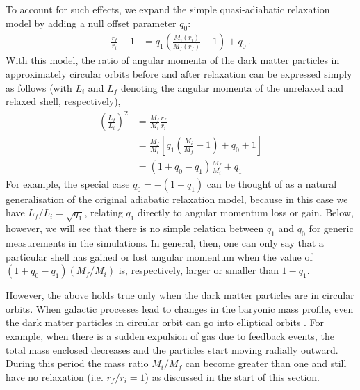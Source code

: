 To account for such effects, we expand the simple quasi-adiabatic relaxation model  by adding 
a null offset parameter $q_0$:
\begin{align}
    \label{eq:chi-linear-q0-ch:simbase}
    \frac{r_f}{r_i} - 1 &= q_1 \left( \frac{M_i(r_i)}{M_f(r_f)} - 1 \right) + q_0\,.
\end{align}
With this model, the ratio of angular momenta of the dark matter particles in approximately circular orbits before and after relaxation can be expressed simply as follows (with $L_i$ and $L_f$ denoting the angular momenta of the unrelaxed and relaxed shell, respectively),
\begin{align}
\left( \frac{L_f}{L_i} \right)^2 &= \frac{M_f}{M_i} \frac{r_f}{r_i}\\
&= \frac{M_f}{M_i} \left[ q_1 \left( \frac{M_i}{M_f} - 1 \right) + q_0 + 1 \right]\\
\label{eq:Lf-Li-ratio-ch:simbase}
&= (1 + q_0 - q_1) \frac{M_f}{M_i} + q_1
\end{align}
For example, the special case $q_0=-(1-q_1)$ can be thought of as a natural generalisation of the original adiabatic relaxation model, because in this case we have $L_f/L_i = \sqrt{q_1}$, relating $q_1$ directly to angular momentum loss or gain.
Below, however, we will see that there is no simple relation between $q_1$ and $q_0$ for generic measurements in the simulations. In general, then, one can only say that a particular shell has gained or lost angular momentum when the value of $(1 + q_0 - q_1) (M_f/M_i)$ is, respectively, larger or smaller than $1-q_1$.

However, the above holds true only when the dark matter particles are in circular orbits. When galactic processes lead to changes in the baryonic mass profile, even the dark matter particles in circular orbit can go into elliptical orbits \citep[see, e.g.][]{2005ApJ...634...70S}. For example, when there is a sudden expulsion of gas due to feedback events, the total mass enclosed decreases and the particles start moving radially outward. During this period the mass ratio $M_i/M_f$ can become greater than one and still have no relaxation (i.e. $r_f/r_i=1$) as discussed in the start of this section.

